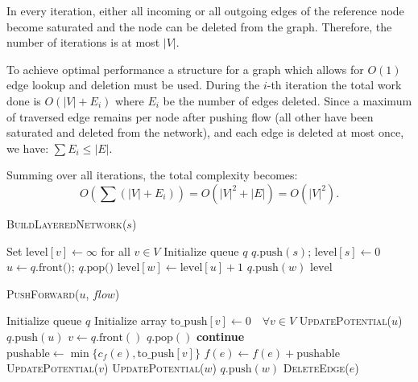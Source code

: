 In every iteration, either all incoming or all outgoing edges of the reference node become saturated and the node can be deleted from the graph. Therefore, the number of iterations is at most $|V|$.

To achieve optimal performance a structure for a graph which allows for $O(1)$ edge lookup and deletion must be used.
During the $i$-th iteration the total work done is $ O(|V| + E_i)$ where $E_i$ be the number of edges deleted. Since a maximum of traversed edge remains per node after pushing flow (all other have been saturated and deleted from the network), and each edge is deleted at most once, we have:
$
\sum E_i \leq |E|.
$

Summing over all iterations, the total complexity becomes:
$$
O\left(\sum (|V| + E_i)\right) = O(|V|^2 + |E|) = O(|V|^2).
$$

\begin{algorithm}[H]
\caption{\textsc{BuildLayeredNetwork}($s$)}
\begin{algorithmic}[1]
\State Set $\text{level}[v] \gets \infty$ for all $v \in V$
\State Initialize queue $q$
\State $q.\text{push}(s)$; $\text{level}[s] \gets 0$
    \State $u \gets q.\text{front()}$; $q.\text{pop()}$
            \State $\text{level}[w] \gets \text{level}[u] + 1$
            \State $q.\text{push}(w)$
        \EndIf
    \EndFor
\EndWhile
\State \Return $\text{level}$
\end{algorithmic}
\end{algorithm}

\begin{algorithm}[H]
\caption{\textsc{PushForward}($u$, $flow$)}
\begin{algorithmic}[1]
\State Initialize queue $q$
\State Initialize array $\text{to\_push}[v] \gets 0 \quad \forall v \in V$
\State \textsc{UpdatePotential}($u$)
\State $q.\text{push}(u)$
    \State $v \gets q.\text{front}()$
    \State $q.\text{pop}()$
        \State \textbf{continue}
    \EndIf
        \State $\text{pushable} \gets \min \{ c_f(e), \text{to\_push}[v] \}$
        \State $f(e) \gets f(e) + \text{pushable}$
        \State \textsc{UpdatePotential}($v$)
        \State \textsc{UpdatePotential}($w$)
            \State $q.\text{push}(w)$
        \EndIf
         
            \State \textsc{DeleteEdge}($e$)
        \EndIf
    \EndFor
\EndWhile
\end{algorithmic}
\end{algorithm}

